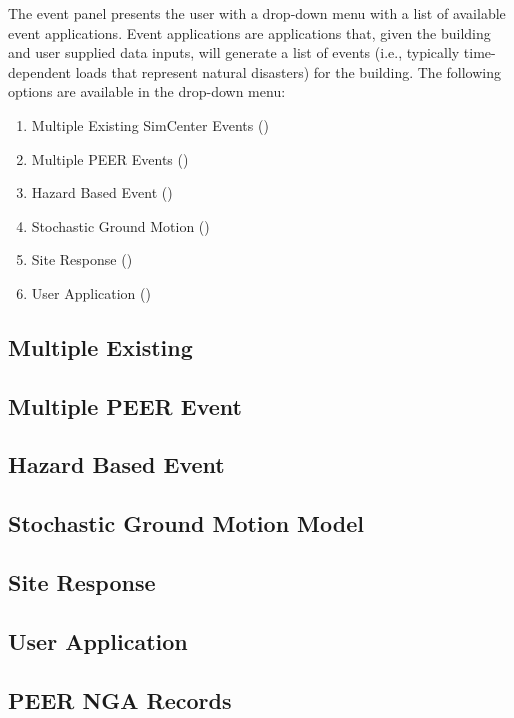 The event panel presents the user with a drop-down menu with a list of
available event applications. Event applications are applications
that, given the building and user supplied data inputs, will generate
a list of events (i.e., typically time-dependent loads that represent natural disasters) for the building. The following options
are available in the drop-down menu:

\begin{enumerate}
\item Multiple Existing SimCenter Events ()
\item Multiple PEER Events ()
\item Hazard Based Event ()
\item Stochastic Ground Motion ()
\item Site Response ()
\item User Application ()
\end{enumerate}

\subsection{Multiple Existing}
\label{subsec:multiple_existing}


\subsection{Multiple PEER Event}
\label{subsec:multiple_peer}


\subsection{Hazard Based Event}
\label{subsec:hazard_based}


\subsection{Stochastic Ground Motion Model}
\label{subsec:stochastic_motions}


\subsection{Site Response}
\label{subsec:site_response}


\subsection{User Application}
\label{subsec:user_event}


\subsection{PEER NGA Records}
\label{subsec:peer_nga_records}

